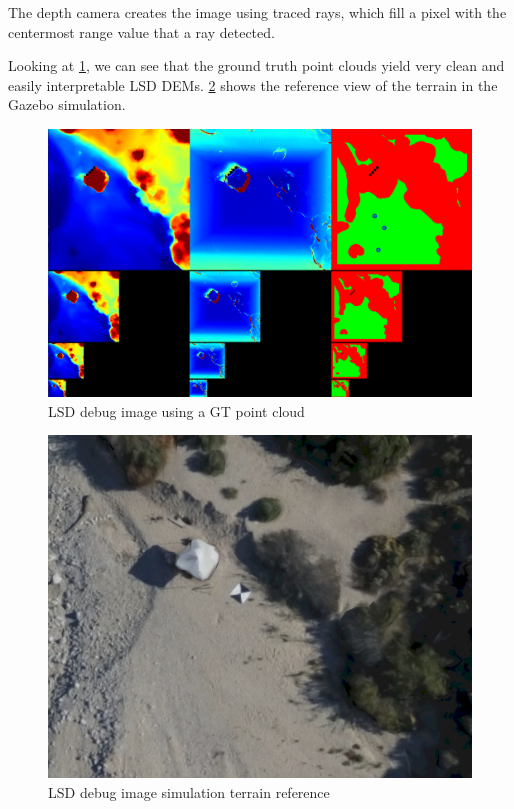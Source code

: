 The depth camera creates the image using traced rays, which fill a pixel with the centermost range value that a ray detected.

Looking at \cref{fig:gt_lsd_debug}, we can see that the ground truth point clouds yield very clean and easily interpretable LSD DEMs. \cref{fig:gt_lsd_debug_reference} shows the reference view of the terrain in the Gazebo simulation.

\begin{figure}[h]
\centering
\includegraphics[scale=0.25]{images/methodology/lsd_debug_image.png}
\caption{LSD debug image using a GT point cloud}
\label{fig:gt_lsd_debug}
\end{figure}

\begin{figure}[h]
\centering
\includegraphics[scale=0.25]{images/methodology/lsd_debug_reference.png}
\caption{LSD debug image simulation terrain reference}
\label{fig:gt_lsd_debug_reference}
\end{figure}
\clearpage %

